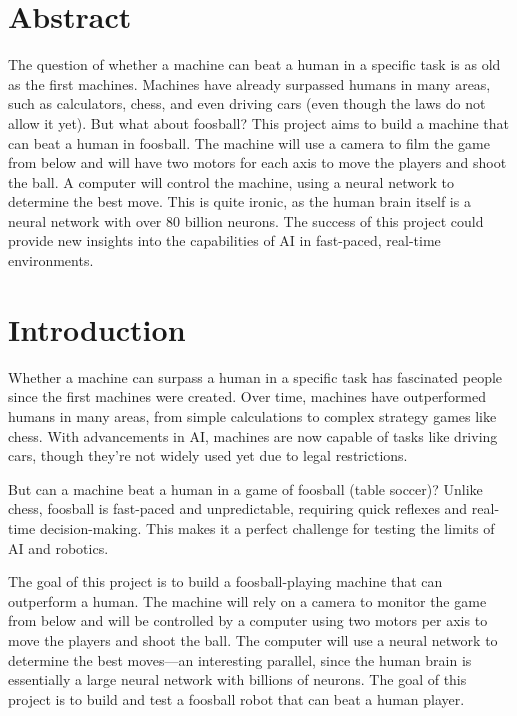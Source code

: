 \section{Abstract}\label{sec:abstract}
The question of whether a machine can beat a human in a specific task is as old as the first machines.
Machines have already surpassed humans in many areas, such as calculators, chess, and even driving cars (even though the laws do not allow it yet).
But what about foosball?
This project aims to build a machine that can beat a human in foosball.
The machine will use a camera to film the game from below and will have two motors for each axis to move the players and shoot the ball.
A computer will control the machine, using a neural network to determine the best move.
This is quite ironic, as the human brain itself is a neural network with over 80 billion neurons.
The success of this project could provide new insights into the capabilities of AI in fast-paced, real-time environments.


\section{Introduction}\label{sec:introduction}

Whether a machine can surpass a human in a specific task has fascinated people since the first machines were created.
Over time, machines have outperformed humans in many areas, from simple calculations to complex strategy games like chess.
With advancements in AI, machines are now capable of tasks like driving cars, though they’re not widely used yet due to legal restrictions.

But can a machine beat a human in a game of foosball (table soccer)?
Unlike chess, foosball is fast-paced and unpredictable, requiring quick reflexes and real-time decision-making.
This makes it a perfect challenge for testing the limits of AI and robotics.

The goal of this project is to build a foosball-playing machine that can outperform a human.
The machine will rely on a camera to monitor the game from below and will be controlled by a computer using two motors per axis to move the players and shoot the ball.
The computer will use a neural network to determine the best moves—an interesting parallel, since the human brain is essentially a large neural network with billions of neurons.
The goal of this project is to build and test a foosball robot that can beat a human player.

